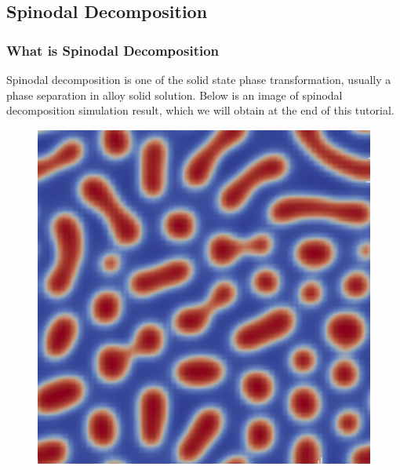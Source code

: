 \documentclass[compress,xcolor={dvipsnames}]{beamer}
\begin{document}
\subsection{Spinodal Decomposition}
\begin{frame}
    \frametitle{What is Spinodal Decomposition}

    Spinodal decomposition is one of the solid state phase transformation, usually a phase separation in alloy solid solution. Below is an image of spinodal decomposition simulation result, which we will obtain at the end of this tutorial.

    \begin{figure}
        \includegraphics[width=0.4\linewidth]{pic/spinodal_image.png}
    \end{figure}

\end{frame}
\end{document}
